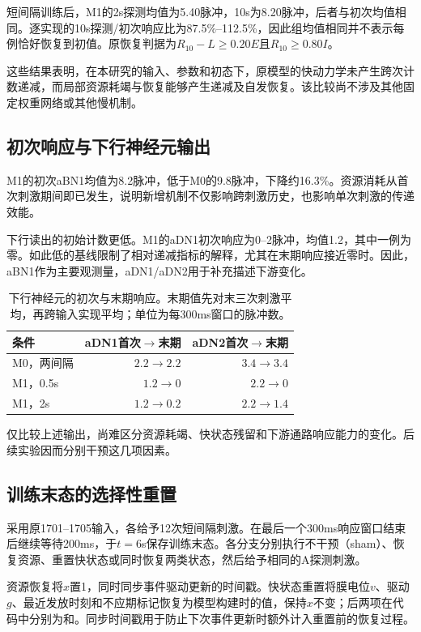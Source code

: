 短间隔训练后，M1的2s探测均值为5.40脉冲，10s为8.20脉冲，后者与初次均值相同。逐实现的10s探测/初次响应比为87.5\%--112.5\%，因此组均值相同并不表示每例恰好恢复到初值。原恢复判据为$R_{10}-L\geq0.20E$且$R_{10}\geq0.80I$。

这些结果表明，在本研究的输入、参数和初态下，原模型的快动力学未产生跨次计数递减，而局部资源耗竭与恢复能够产生递减及自发恢复。该比较尚不涉及其他固定权重网络或其他慢机制。

\subsection{初次响应与下行神经元输出}
M1的初次aBN1均值为8.2脉冲，低于M0的9.8脉冲，下降约16.3\%。资源消耗从首次刺激期间即已发生，说明新增机制不仅影响跨刺激历史，也影响单次刺激的传递效能。

下行读出的初始计数更低。M1的aDN1初次响应为0--2脉冲，均值1.2，其中一例为零。如此低的基线限制了相对递减指标的解释，尤其在末期响应接近零时。因此，aBN1作为主要观测量，aDN1/aDN2用于补充描述下游变化。

\begin{table}[!htbp]\centering\small
\caption{下行神经元的初次与末期响应。末期值先对末三次刺激平均，再跨输入实现平均；单位为每300ms窗口的脉冲数。}
\begin{tabular}{lrr}\toprule
条件 & aDN1首次$\to$末期 & aDN2首次$\to$末期\\\midrule
M0，两间隔 & $2.2\to2.2$ & $3.4\to3.4$\\
M1，0.5s & $1.2\to0$ & $2.2\to0$\\
M1，2s & $1.2\to0.2$ & $2.2\to1.4$\\\bottomrule
\end{tabular}\end{table}

仅比较上述输出，尚难区分资源耗竭、快状态残留和下游通路响应能力的变化。后续实验因而分别干预这几项因素。

\subsection{训练末态的选择性重置}
采用原1701--1705输入，各给予12次短间隔刺激。在最后一个300ms响应窗口结束后继续等待200ms，于$t=6$s保存训练末态。各分支分别执行不干预（sham）、恢复资源、重置快状态或同时恢复两类状态，然后给予相同的A探测刺激。

资源恢复将$x$置1，同时同步事件驱动更新的时间戳。快状态重置将膜电位$v$、驱动$g$、最近发放时刻和不应期标记恢复为模型构建时的值，保持$x$不变；后两项在代码中分别为和。同步时间戳用于防止下次事件更新时额外计入重置前的恢复过程。

